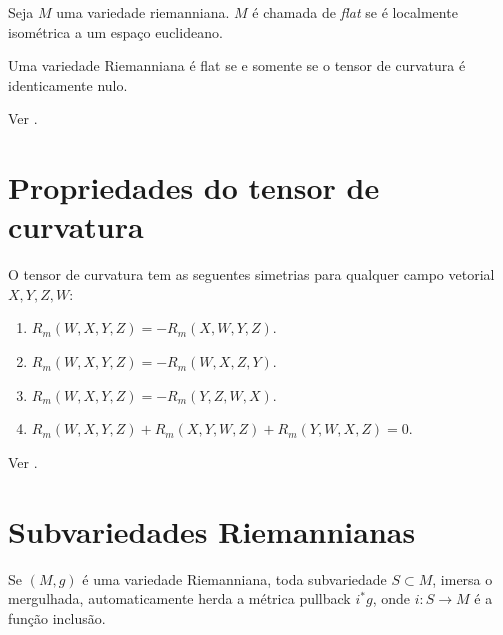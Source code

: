 \begin{definicao}
	Seja $M$ uma variedade riemanniana.
	$M$ é chamada de \emph{flat} se é localmente isométrica a um espaço euclideano.
\end{definicao}

\begin{teorema}
	Uma variedade Riemanniana é flat se e somente se o tensor de curvatura é identicamente nulo.
\end{teorema}

\begin{demonstracao}
	Ver \cite[Theorem 7.3]{Lee1997}.
\end{demonstracao}


\section{Propriedades do tensor de curvatura}

\begin{proposicao}\label{simetrias-del-tensor-de-curvatura}
	O tensor de curvatura tem as seguentes simetrias para qualquer campo vetorial $X,Y,Z,W$:
	\begin{enumerate}
		\item $R_m(W,X,Y,Z) = -R_m(X,W,Y,Z)$.
		\item $R_m(W,X,Y,Z) = -R_m(W,X,Z,Y)$.
		\item $R_m(W,X,Y,Z) = -R_m(Y,Z,W,X)$.
		\item $R_m(W,X,Y,Z) + R_m(X,Y,W,Z) + R_m(Y,W,X,Z) = 0$.
	\end{enumerate}
\end{proposicao}

\begin{demonstracao}
	Ver \cite[Proposition 7.4]{Lee1997}.
\end{demonstracao}








\section{Subvariedades Riemannianas}

\begin{observacao}
	Se $(M,g)$ é uma variedade Riemanniana, toda subvariedade $S \subset M$, imersa o mergulhada, automaticamente herda a métrica pullback $i^* g$, onde $i: S \rightarrow M$ é a função inclusão.
\end{observacao}

